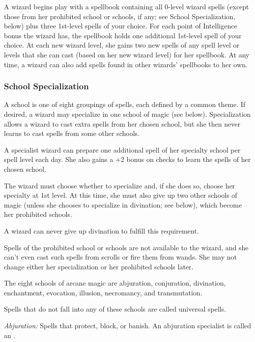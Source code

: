 A wizard begins play with a spellbook containing all 0-level wizard spells (except those from her prohibited school or schools, if any; see School Specialization, below) plus three 1st-level spells of your choice. For each point of Intelligence bonus the wizard has, the spellbook holds one additional 1st-level spell of your choice. At each new wizard level, she gains two new spells of any spell level or levels that she can cast (based on her new wizard level) for her spellbook. At any time, a wizard can also add spells found in other wizards' spellbooks to her own.

\subsubsection{School Specialization}

A school is one of eight groupings of spells, each defined by a common theme. If desired, a wizard may specialize in one school of magic (see below). Specialization allows a wizard to cast extra spells from her chosen school, but she then never learns to cast spells from some other schools.

A specialist wizard can prepare one additional spell of her specialty school per spell level each day. She also gains a +2 bonus on  checks to learn the spells of her chosen school.

The wizard must choose whether to specialize and, if she does so, choose her specialty at 1st level. At this time, she must also give up two other schools of magic (unless she chooses to specialize in divination; see below), which become her prohibited schools.

A wizard can never give up divination to fulfill this requirement.

Spells of the prohibited school or schools are not available to the wizard, and she can't even cast such spells from scrolls or fire them from wands. She may not change either her specialization or her prohibited schools later.

The eight schools of arcane magic are abjuration, conjuration, divination, enchantment, evocation, illusion, necromancy, and transmutation.

Spells that do not fall into any of these schools are called universal spells.

\textit{Abjuration:} Spells that protect, block, or banish. An abjuration specialist is called an .

